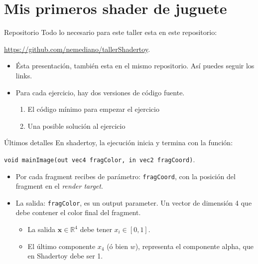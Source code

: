 \section{Mis primeros shader de juguete}
\begin{frame}{Repositorio}
Todo lo necesario para este taller esta en este repositorio: 
\begin{block}{}
\url{https://github.com/nemediano/tallerShadertoy}.
\end{block}
\begin{itemize}
    \item Ésta presentación, también esta en el mismo repositorio. Así puedes seguir los links.
    \item Para cada ejercicio, hay dos versiones de código fuente.
    \begin{enumerate}
        \item El código mínimo para empezar el ejercicio
        \item Una posible solución al ejercicio 
    \end{enumerate}
\end{itemize}

\end{frame}

\begin{frame}{Últimos detalles}
En shadertoy, la ejecución inicia y termina con la función:

\texttt{void mainImage(out vec4 fragColor, in vec2 fragCoord)}.

\begin{itemize}
    \item Por cada fragment recibes de parámetro: \texttt{fragCoord}, con la posición del fragment en el \emph{render target}.
    \item La salida: \texttt{fragColor}, es un output parameter. Un vector de dimensión 4 que debe contener el color final del fragment.
    \begin{itemize}
        \item La salida $\mathbf{x} \in \mathbb{R}^{4}$ debe tener $ x_i \in [0, 1]$.
        \item El último componente $x_4$ (ó bien $w$), representa el componente alpha, que en Shadertoy debe ser 1.
    \end{itemize}
\end{itemize}
\end{frame}

